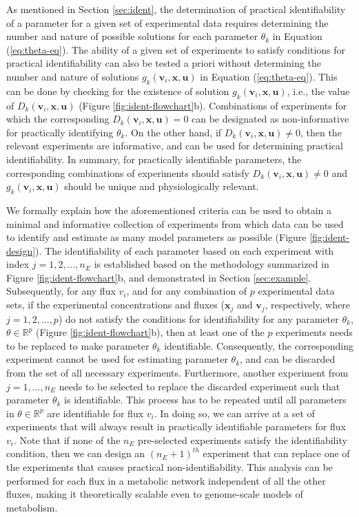 \documentclass[10pt]{article}
\begin{document}
	As mentioned in Section \ref{sec:ident}, the determination of practical identifiability of a parameter for a given set of experimental data requires determining the number and nature of possible solutions for each parameter $\theta_k$ in Equation (\ref{eq:theta-eq}). 
	The ability of a given set of experiments to satisfy conditions for practical identifiability can also be tested a priori without determining the number and nature of solutions $g_k(\mathbf{v}_i, \mathbf{x}, \mathbf{u})$ in Equation (\ref{eq:theta-eq}). This can be done by checking for the existence of solution $g_k(\mathbf{v}_i, \mathbf{x}, \mathbf{u})$, i.e., the value of $D_k(\mathbf{v}_i, \mathbf{x}, \mathbf{u})$ (Figure \ref{fig:ident-flowchart}b). Combinations of experiments for which the corresponding $D_k(\mathbf{v}_i, \mathbf{x}, \mathbf{u}) = 0$ can be designated as non-informative for practically identifying $\theta_k$. On the other hand, if $D_k(\mathbf{v}_i, \mathbf{x}, \mathbf{u})\neq0$, then the relevant experiments are informative, and can be used for determining practical identifiability. In summary, for practically identifiable parameters, the corresponding combinations of experiments should satisfy $D_k(\mathbf{v}_i, \mathbf{x}, \mathbf{u})\neq0$ and $g_k(\mathbf{v}_i, \mathbf{x}, \mathbf{u})$ should be unique and physiologically relevant. 
	
	We formally explain how the aforementioned criteria can be used to obtain a minimal and informative collection of experiments from which data can be used to identify and estimate as many model parameters as possible (Figure \ref{fig:ident-design}). The identifiability of each parameter based on each experiment with index $j = {1, 2, ..., n_E}$ is established based on the methodology summarized in Figure \ref{fig:ident-flowchart}b, and demonstrated in Section \ref{sec:example}. Subsequently, for any flux $v_i$, and for any combination of $p$ experimental data sets, if the experimental concentrations and fluxes ($\mathbf{x}_j$ and $\mathbf{v}_j$, respectively, where $j = {1, 2,..., p}$) do not satisfy the conditions for identifiability for any parameter $\theta_k$, $\theta\in\mathbb{R}^{p}$ (Figure \ref{fig:ident-flowchart}b), then at least one of the $p$ experiments needs to be replaced to make parameter $\theta_k$ identifiable. Consequently, the corresponding experiment cannot be used for estimating parameter $\theta_k$, and can be discarded from the set of all necessary experiments. Furthermore, another experiment from $j = {1, ..., n_E}$ needs to be selected to replace the discarded experiment such that parameter $\theta_k$ is identifiable. This process has to be repeated until all parameters in $\theta\in\mathbb{R}^p$ are identifiable for flux $v_i$. In doing so, we can arrive at a set of experiments that will always result in practically identifiable parameters for flux $v_i$. Note that if none of the $n_E$ pre-selected experiments satisfy the identifiability condition, then we can design an $(n_E+1)^{th}$ experiment that can replace one of the experiments that causes practical non-identifiability. This analysis can be performed for each flux in a metabolic network independent of all the other fluxes, making it theoretically scalable even to genome-scale models of metabolism. 		
	
\end{document}
